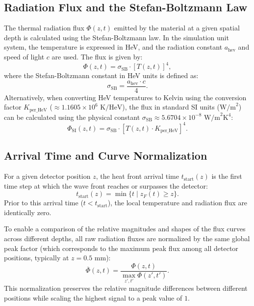 \documentclass{article}
\begin{document}
\subsection{Radiation Flux and the Stefan-Boltzmann Law}
The thermal radiation flux $\Phi(z, t)$ emitted by the material at a given spatial depth is calculated using the Stefan-Boltzmann law. In the simulation unit system, the temperature is expressed in HeV, and the radiation constant $a_{\text{hev}}$ and speed of light $c$ are used. The flux is given by:
\begin{equation}
\Phi(z, t) = \sigma_{\text{SB}} \cdot [T(z, t)]^4,
\end{equation}
where the Stefan-Boltzmann constant in HeV units is defined as:
\begin{equation}
\sigma_{\text{SB}} = \frac{a_{\text{hev}} \cdot c}{4}.
\end{equation}
Alternatively, when converting HeV temperatures to Kelvin using the conversion factor $K_{\text{per\_HeV}}$ ($\approx 1.1605 \times 10^6 \text{ K/HeV}$), the flux in standard SI units ($\text{W/m}^2$) can be calculated using the physical constant $\sigma_{\text{SB}} \approx 5.6704 \times 10^{-8}\text{ W/m}^2\text{K}^4$:
\begin{equation}
\Phi_{\text{SI}}(z, t) = \sigma_{\text{SB}} \cdot \left[ T(z, t) \cdot K_{\text{per\_HeV}} \right]^4.
\end{equation}

\subsection{Arrival Time and Curve Normalization}
For a given detector position $z$, the heat front arrival time $t_{\text{start}}(z)$ is the first time step at which the wave front reaches or surpasses the detector:
\begin{equation}
t_{\text{start}}(z) = \min \{ t \mid z_F(t) \ge z \}.
\end{equation}
Prior to this arrival time ($t < t_{\text{start}}$), the local temperature and radiation flux are identically zero. 

To enable a comparison of the relative magnitudes and shapes of the flux curves across different depths, all raw radiation fluxes are normalized by the same global peak factor (which corresponds to the maximum peak flux among all detector positions, typically at $z = 0.5\text{ mm}$):
\begin{equation}
\overline{\Phi}(z, t) = \frac{\Phi(z, t)}{\max_{z', t'} \Phi(z', t')}.
\end{equation}
This normalization preserves the relative magnitude differences between different positions while scaling the highest signal to a peak value of $1$.
\end{document}
